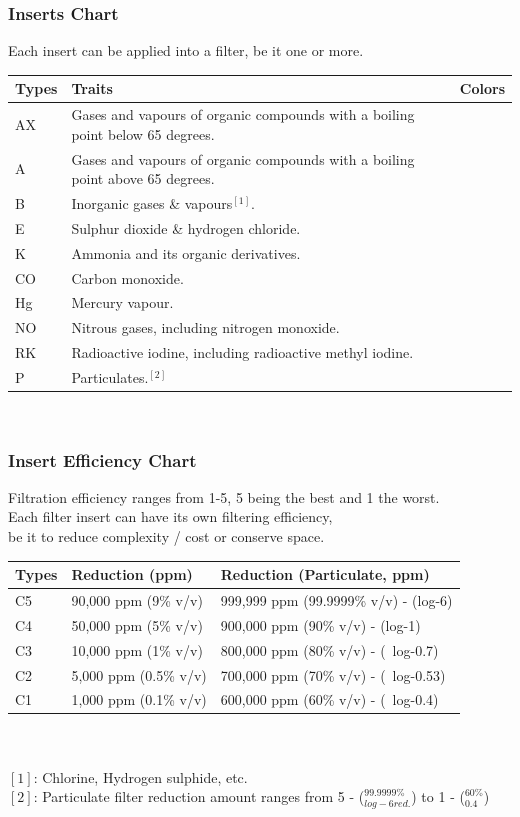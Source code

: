\documentclass[a4paper, 12pt]{article}
\begin{document}
{	\subsubsection{Inserts Chart}
		Each insert can be applied into a filter, be it one or more.
		\begin{tabular}{|p{1cm}||p{10cm}|p{1.57cm}|}
			\hline
			Types & Traits & Colors \\\hline
			AX & Gases and vapours of organic compounds with a boiling point below 65 degrees. & \cellcolor[HTML]{995000} \\
			A & Gases and vapours of organic compounds with a boiling point above 65 degrees. & \cellcolor[HTML]{997000} \\
			B & Inorganic gases \& vapours$^{[1]}$. & \cellcolor[HTML]{CACACA} \\
			E & Sulphur dioxide \& hydrogen chloride. & \cellcolor[HTML]{CCBB00} \\
			K & Ammonia and its organic derivatives. & \cellcolor[HTML]{00AA00} \\
			CO & Carbon monoxide. & \cellcolor[HTML]{000000} \\
			Hg & Mercury vapour. & \cellcolor[HTML]{990000} \\
			NO & Nitrous gases, including nitrogen monoxide. & \cellcolor[HTML]{0000BB} \\
			RK & Radioactive iodine, including radioactive methyl iodine. & \cellcolor[HTML]{E96000} \\
			P & Particulates.$^{[2]}$ & \cellcolor[HTML]{424242} \\\hline
		\end{tabular} \-\\
		\subsubsection{Insert Efficiency Chart}
			Filtration efficiency ranges from 1-5, 5 being the best and 1 the worst. \\
			Each filter insert can have its own filtering efficiency, \\
			be it to reduce complexity / cost or conserve space.
			\begin{tabular}{|p{1cm}||p{4cm}|p{7.57cm}|}
				\hline
				Types & Reduction (ppm) & Reduction (Particulate, ppm) \\\hline
				C5 & 90,000 ppm (9\% v/v) & 999,999 ppm (99.9999\% v/v) - (log-6) \\
				C4 & 50,000 ppm (5\% v/v) & 900,000 ppm (90\% v/v) - (log-1) \\
				C3 & 10,000 ppm (1\% v/v) & 800,000 ppm (80\% v/v) - (~log-0.7) \\
				C2 & 5,000  ppm (0.5\% v/v) & 700,000 ppm (70\% v/v) - (~log-0.53) \\
				C1 & 1,000  ppm (0.1\% v/v) & 600,000 ppm (60\% v/v) - (~log-0.4) 	\\\hline
			\end{tabular} \\ \- \\
			$[1]$: Chlorine, Hydrogen sulphide, etc. \\
			$[2]$: Particulate filter reduction amount ranges from
			 5 - ($^{99.9999\%}_{log-6red.}$) to 1 - ($^{60\%}_{0.4}$)
			
}
\end{document}
